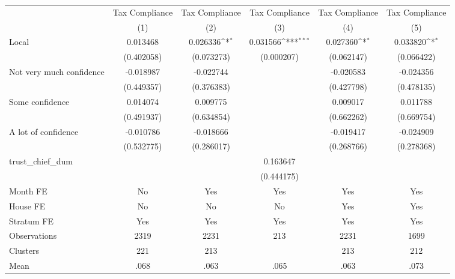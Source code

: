 {
\def\sym#1{\ifmmode^{#1}\else\(^{#1}\)\fi}
\begin{tabular}{l*{5}{c}}
\toprule
                &\multicolumn{1}{c}{Tax Compliance}&\multicolumn{1}{c}{Tax Compliance}&\multicolumn{1}{c}{Tax Compliance}&\multicolumn{1}{c}{Tax Compliance}&\multicolumn{1}{c}{Tax Compliance}\\
                &\multicolumn{1}{c}{(1)}         &\multicolumn{1}{c}{(2)}         &\multicolumn{1}{c}{(3)}         &\multicolumn{1}{c}{(4)}         &\multicolumn{1}{c}{(5)}         \\
\midrule
Local           & 0.013468         & 0.026336\sym{*}  & 0.031566\sym{***}& 0.027360\sym{*}  & 0.033820\sym{*}  \\
                &(0.402058)         &(0.073273)         &(0.000207)         &(0.062147)         &(0.066422)         \\
Not very much confidence&-0.018987         &-0.022744         &                  &-0.020583         &-0.024356         \\
                &(0.449357)         &(0.376383)         &                  &(0.427798)         &(0.478135)         \\
Some confidence & 0.014074         & 0.009775         &                  & 0.009017         & 0.011788         \\
                &(0.491937)         &(0.634854)         &                  &(0.662262)         &(0.669754)         \\
A lot of confidence&-0.010786         &-0.018666         &                  &-0.019417         &-0.024909         \\
                &(0.532775)         &(0.286017)         &                  &(0.268766)         &(0.278368)         \\
trust\_chief\_dum &                  &                  & 0.163647         &                  &                  \\
                &                  &                  &(0.444175)         &                  &                  \\
Month FE        &       No         &      Yes         &      Yes         &      Yes         &      Yes         \\
House FE        &       No         &       No         &       No         &      Yes         &      Yes         \\
Stratum FE      &      Yes         &      Yes         &      Yes         &      Yes         &      Yes         \\
\midrule
Observations    &     2319         &     2231         &      213         &     2231         &     1699         \\
Clusters        &      221         &      213         &                  &      213         &      212         \\
Mean            &     .068         &     .063         &     .065         &     .063         &     .073         \\
\bottomrule
\end{tabular}
}
